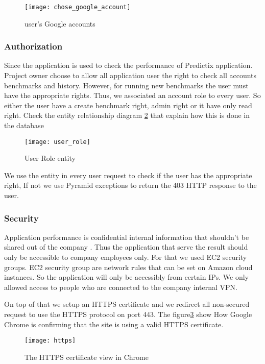 \begin{figure}[h]
  \centerline{\texttt{[image: chose\_google\_account]}}
\caption{user's Google accounts}
\label{fig:google_auth}
\end{figure}

\subsubsection{Authorization}
Since the application is used to check the performance of Predictix application.
Project owner choose to allow all application user the right to check all
accounts benchmarks and history. However, for running new benchmarks the user
must have the appropriate rights. Thus, we associated an account role to every
user. So either the user have a create benchmark right, admin right or it have
only read right. Check the entity relationship diagram
\hyperref[fig:user_role]{\ref{fig:user_role}} that explain how this is
done in the database
\begin{figure}[h]
  \centerline{\texttt{[image: user\_role]}}
\caption{User Role entity}
\label{fig:user_role}
\end{figure}
We use the entity in every user request to check if the user has the appropriate
right, If not we use Pyramid exceptions to return the 403 HTTP response to the
user.

\subsubsection{Security}
Application performance is confidential internal information that shouldn't be
shared out of the company . Thus the application that serve the result should
only be accessible to company employees only. For that we used EC2 security
groups.
EC2 security group are network rules that can be set on Amazon cloud instances.
So the application will only be accessibly from certain IPs. We only allowed
access to people who are connected to the company internal VPN.

On top of that we setup an HTTPS certificate and we redirect all non-secured
request to use the HTTPS protocol on port 443. The
figure\hyperref[fig:https]{\ref{fig:https}} show How Google Chrome is
confirming that the site is using a valid HTTPS certificate.
\begin{figure}[h]
  \centerline{\texttt{[image: https]}}
\caption{The HTTPS certificate view in Chrome}
\label{fig:https}
\end{figure}

